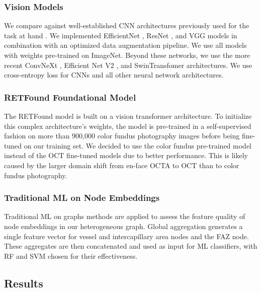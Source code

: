\subsubsection{Vision Models}
We compare against well-established CNN architectures previously used for the task at hand \cite{qian2023drac}. We implemented EfficientNet \cite{tan2019efficientnet}, ResNet \cite{xie2017aggregated}, and VGG \cite{simonyan2014very} models in combination with an optimized data augmentation pipeline. We use all models with weights pre-trained on ImageNet. Beyond these networks, we use the more recent ConvNeXt \cite{liu2022convnet}, Efficient Net V2 \cite{tan2021efficientnetv2}, and SwinTransfomer \cite{liu2021swin} architectures. We use cross-entropy loss for CNNs and all other neural network architectures. 

\subsubsection{RETFound Foundational Model}
The RETFound model \cite{zhou2023foundation} is built on a vision transformer architecture. To initialize this complex architecture's weights, the model is pre-trained in a self-supervised fashion on more than 900,000 color fundus photography images before being fine-tuned on our training set. We decided to use the color fundus pre-trained model instead of the OCT fine-tuned models due to better performance. This is likely caused by the larger domain shift from en-face OCTA to OCT than to color fundus photography.  

\subsubsection{Traditional ML on Node Embeddings}
Traditional ML on graphs methods are applied to assess the feature quality of node embeddings in our heterogeneous graph. Global aggregation generates a single feature vector for vessel and intercapillary area nodes and the FAZ node. These aggregates are then concatenated and used as input for ML classifiers, with RF and SVM chosen for their effectiveness. 

\subsection{Results}

